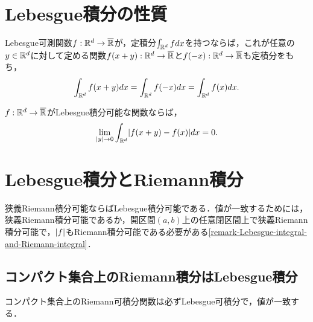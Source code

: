 \documentclass[uplatex, dvipdfmx]{jsreport}
\begin{document}
\section{Lebesgue積分の性質}

\begin{theorem}[平行移動不変性]\label{thm-invariance-of-Lebesgue-integral}
    Lebesgue可測関数$f:\mathbb{R}^d\to\overline{\mathbb{R}}$が，定積分$\int_{\mathbb{R}^d}fdx$を持つならば，これが任意の$y\in\mathbb{R}^d$に対して定める関数$f(x+y):\mathbb{R}^d\to\overline{\mathbb{R}}$と$f(-x):\mathbb{R}^d\to\overline{\mathbb{R}}$も定積分をもち，
    \[\int_{\mathbb{R}^d}f(x+y)dx=\int_{\mathbb{R}^d}f(-x)dx=\int_{\mathbb{R}^d}f(x)dx.\]
\end{theorem}

\begin{theorem}
    $f:\mathbb{R}^d\to\overline{\mathbb{R}}$がLebesgue積分可能な関数ならば，
    \[\lim_{\lvert y\rvert\to 0}\int_{\mathbb{R}^d}\lvert f(x+y)-f(x)\rvert dx=0.\]
\end{theorem}

\section{Lebesgue積分とRiemann積分}

\begin{tcolorbox}[colframe=ForestGreen, colback=ForestGreen!10!white,breakable,colbacktitle=ForestGreen!40!white,coltitle=black,fonttitle=\bfseries\sffamily,
title=]
    狭義Riemann積分可能ならばLebesgue積分可能である．値が一致するためには，狭義Riemann積分可能であるか，開区間$(a,b)$上の任意閉区間上で狭義Riemann積分可能で，$\lvert f\rvert$もRiemann積分可能である必要がある\ref{remark-Lebesgue-integral-and-Riemann-integral}．
\end{tcolorbox}

\subsection{コンパクト集合上のRiemann積分はLebesgue積分}

\begin{tcolorbox}[colframe=ForestGreen, colback=ForestGreen!10!white,breakable,colbacktitle=ForestGreen!40!white,coltitle=black,fonttitle=\bfseries\sffamily,
title=]
    コンパクト集合上のRiemann可積分関数は必ずLebesgue可積分で，値が一致する．
\end{tcolorbox}
\end{document}
